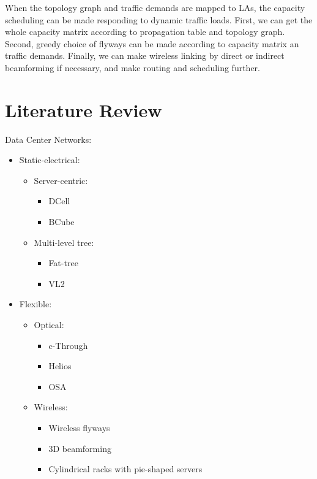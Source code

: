 \documentclass[journal,onecolumn,11pt]{IEEEtran}
\begin{document}
When the topology graph and traffic demands are mapped to LAs, the capacity scheduling can be made responding to dynamic traffic loads. First, we can get the whole capacity matrix according to propagation table and topology graph. Second, greedy choice of flyways can be made according to capacity matrix an traffic demands. Finally, we can make wireless linking by direct or indirect beamforming if necessary, and make routing and scheduling further.

\section{Literature Review}

Data Center Networks:
\begin{itemize}
  \item Static-electrical:
  \begin{itemize}
    \item Server-centric:
    \begin{itemize}
      \item DCell\cite{Guo:2008:DSF:1402958.1402968}
      \item BCube\cite{Guo:2009:BHP:1592568.1592577}
    \end{itemize}
    \item Multi-level tree:
    \begin{itemize}
      \item Fat-tree\cite{Al-Fares:2008:SCD:1402958.1402967}
      \item VL2\cite{Greenberg:2009:VSF:1592568.1592576}
    \end{itemize}
  \end{itemize}
  \item Flexible:
  \begin{itemize}
    \item Optical:
    \begin{itemize}
      \item c-Through\cite{Wang:2010:CPO:1851182.1851222}
      \item Helios\cite{Farrington:2010:HHE:1851182.1851223}
      \item OSA\cite{chen2012osa}
    \end{itemize}
    \item Wireless:
    \begin{itemize}
      \item Wireless flyways\cite{Halperin:2011:ADC:2018436.2018442}
      \item 3D beamforming\cite{Zhou:2012:MMC:2342356.2342440}
      \item Cylindrical racks with pie-shaped servers \cite{Shin:2012:FCW:2396556.2396560}
    \end{itemize}
  \end{itemize}
\end{itemize}
\end{document}
